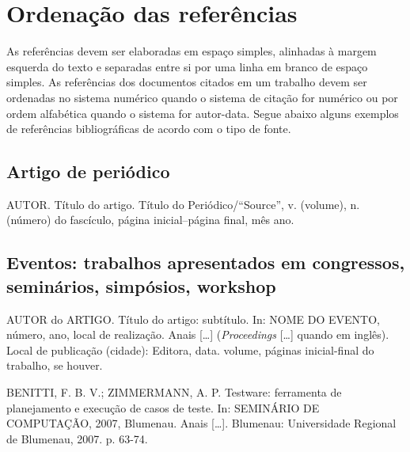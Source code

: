 
\section{Ordenação das referências}

As referências devem ser elaboradas em espaço simples, alinhadas à margem esquerda do texto e separadas entre si por uma linha em branco de espaço simples. As referências dos documentos citados em um trabalho devem ser ordenadas no sistema numérico quando o sistema de citação for numérico ou por ordem alfabética quando o sistema for autor-data. Segue abaixo alguns exemplos de referências bibliográficas de acordo com o tipo de fonte.

\subsection{Artigo de periódico}

AUTOR. Título do artigo. Título do Periódico/``Source'', v. (volume), n. (número) do fascículo, página inicial--página final, mês ano.




\subsection{Eventos: trabalhos apresentados em congressos, seminários, simpósios, workshop}

AUTOR do ARTIGO. Título do artigo: subtítulo. In: NOME DO EVENTO, número, ano, local de realização. Anais [\ldots] (\textit{Proceedings} [\ldots] quando em inglês). Local de publicação (cidade): Editora, data. volume, páginas inicial-final do trabalho, se houver.


BENITTI, F. B. V.; ZIMMERMANN, A. P. Testware: ferramenta de planejamento e execução de casos de teste. In: SEMINÁRIO DE COMPUTAÇÃO, 2007, Blumenau. Anais [\ldots]. Blumenau: Universidade Regional de Blumenau, 2007. p. 63-74.





